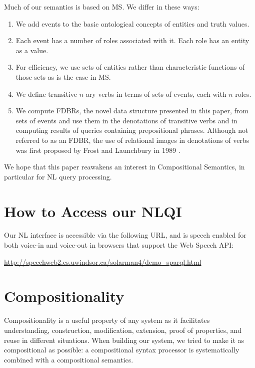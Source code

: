 \documentclass[../main.tex]{subfiles}
\begin{document}
\begin{refsection}
Much of our semantics is based on MS. We differ in these ways:

\begin{enumerate}
	\item We add events to the basic ontological concepts of entities and truth values.
	\item Each event has a number of roles associated with it. Each role has an entity as a value.
	\item For efficiency, we use sets of entities rather than characteristic functions of those sets as is the case in MS.
	\item We define transitive $n$-ary verbs in terms of sets of events, each with $n$ roles.
	\item We compute FDBRs, the novel data structure presented in this paper, from sets of events and use them in the denotations of transitive verbs and in computing results of queries containing prepositional phrases. Although not referred to as an FDBR, the use of relational images in denotations of verbs was first proposed by Frost and Launchbury in 1989 \cite{frost1989constructing}.
\end{enumerate}
We hope that this paper reawakens an interest in Compositional Semantics, in particular for NL query processing.

\section{How to Access our NLQI}
\label{webist2019journal:access}

Our NL interface is accessible via the following URL, and is speech enabled for both voice-in and voice-out in browsers that support the Web Speech API:

\begin{center}
	\url{http://speechweb2.cs.uwindsor.ca/solarman4/demo_sparql.html}
\end{center}

\section{Compositionality}
\label{webist2019journal:compositionality}

Compositionality is a useful property of any system as it facilitates understanding, construction, modification, extension, proof of properties,  and reuse in different situations. When building our system, we tried to make it as compositional as possible: a compositional syntax processor is systematically combined with a compositional semantics.


\end{refsection}
\end{document}

